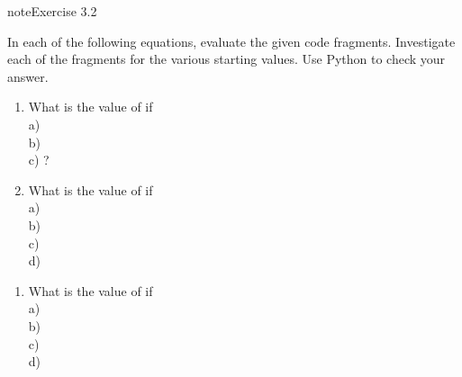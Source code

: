 \documentclass[letterpaper,10pt,english]{jupyterBook}
\begin{document}
\begin{sphinxadmonition}{note}{Exercise 3.2}

\sphinxAtStartPar
In each of the following equations, evaluate the given code fragments. Investigate each of the fragments for the various starting values. Use Python to check your answer.
\begin{enumerate}
%
\item {} 
\sphinxAtStartPar
What is the value of  if\\
a) \\
b) \\
c)  ?

\begin{sphinxVerbatim}[commandchars=\\\{\}]
       
            
            
\end{sphinxVerbatim}

\item {} 
\sphinxAtStartPar
What is the value of  if\\
a) \\
b) \\
c) \\
d) 

\end{enumerate}

\begin{sphinxVerbatim}[commandchars=\\\{\}]
       
          
       
            
       
          
          
\end{sphinxVerbatim}
\begin{enumerate}
%
\setcounter{enumi}{2}
\item {} 
\sphinxAtStartPar
What is the value of  if\\
a) \\
b) \\
c) \\
d) 


\end{enumerate}
\end{sphinxadmonition}
\end{document}
